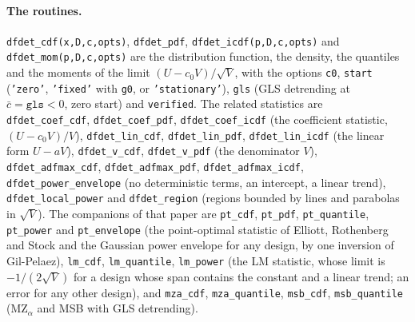 \documentclass[11pt]{article}
\newcommand{\code}[1]{\texttt{#1}}
\begin{document}
\paragraph{The routines.}  \code{dfdet\_cdf(x,D,c,opts)}, \code{dfdet\_pdf}, \code{dfdet\_icdf(p,D,c,opts)} and \code{dfdet\_mom(p,D,c,opts)} are the distribution function, the density, the quantiles and the moments of the limit $(U-c_0V)/\sqrt V$, with the options \code{c0}, \code{start} (\code{'zero'}, \code{'fixed'} with \code{g0}, or \code{'stationary'}), \code{gls} (GLS detrending at $\bar c=\code{gls}<0$, zero start) and \code{verified}.  The related statistics are \code{dfdet\_coef\_cdf}, \code{dfdet\_coef\_pdf}, \code{dfdet\_coef\_icdf} (the coefficient statistic, $(U-c_0V)/V$), \code{dfdet\_lin\_cdf}, \code{dfdet\_lin\_pdf}, \code{dfdet\_lin\_icdf} (the linear form $U-aV$), \code{dfdet\_v\_cdf}, \code{dfdet\_v\_pdf} (the denominator $V$), \code{dfdet\_adfmax\_cdf}, \code{dfdet\_adfmax\_pdf}, \code{dfdet\_adfmax\_icdf}, \code{dfdet\_power\_envelope} (no deterministic terms, an intercept, a linear trend), \code{dfdet\_local\_power} and \code{dfdet\_region} (regions bounded by lines and parabolas in $\sqrt V$).  The companions of that paper are \code{pt\_cdf}, \code{pt\_pdf}, \code{pt\_quantile}, \code{pt\_power} and \code{pt\_envelope} (the point-optimal statistic of Elliott, Rothenberg and Stock and the Gaussian power envelope for any design, by one inversion of Gil-Pelaez), \code{lm\_cdf}, \code{lm\_quantile}, \code{lm\_power} (the LM statistic, whose limit is $-1/(2\sqrt V)$ for a design whose span contains the constant and a linear trend; an error for any other design), and \code{mza\_cdf}, \code{mza\_quantile}, \code{msb\_cdf}, \code{msb\_quantile} (MZ$_\alpha$ and MSB with GLS detrending).
\end{document}

